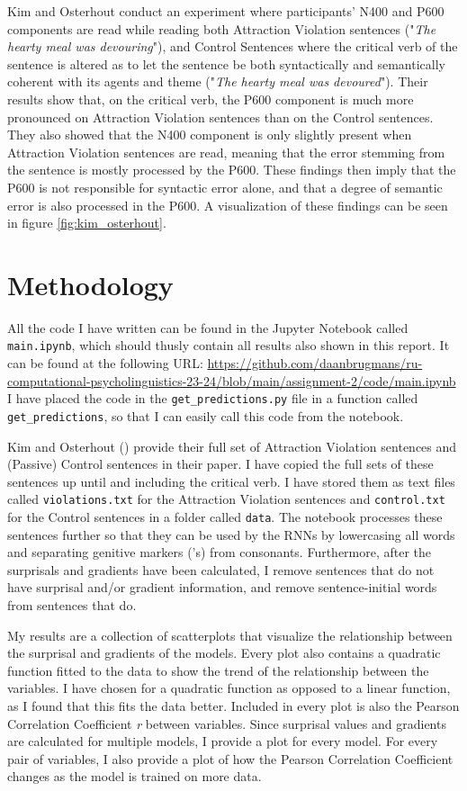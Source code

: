 \documentclass{IEEEtran}
\begin{document}
Kim and Osterhout conduct an experiment where participants' N400 and P600 components are read while reading both Attraction Violation sentences ("\textit{The hearty meal was devouring}"), and Control Sentences where the critical verb of the sentence is altered as to let the sentence be both syntactically and semantically coherent with its agents and theme ("\textit{The hearty meal was devoured}").
Their results show that, on the critical verb, the P600 component is much more pronounced on Attraction Violation sentences than on the Control sentences.
They also showed that the N400 component is only slightly present when Attraction Violation sentences are read, meaning that the error stemming from the sentence is mostly processed by the P600.
These findings then imply that the P600 is not responsible for syntactic error alone, and that a degree of semantic error is also processed in the P600.
A visualization of these findings can be seen in figure \ref{fig:kim_osterhout}.

\section{Methodology}
All the code I have written can be found in the Jupyter Notebook called \texttt{main.ipynb}, which should thusly contain all results also shown in this report.
It can be found at the following URL: \url{https://github.com/daanbrugmans/ru-computational-psycholinguistics-23-24/blob/main/assignment-2/code/main.ipynb}
I have placed the code in the \texttt{get\_predictions.py} file in a function called \texttt{get\_predictions}, so that I can easily call this code from the notebook.

Kim and Osterhout (\cite{kim2005combinatory}) provide their full set of Attraction Violation sentences and (Passive) Control sentences in their paper.
I have copied the full sets of these sentences up until and including the critical verb.
I have stored them as text files called \texttt{violations.txt} for the Attraction Violation sentences and \texttt{control.txt} for the Control sentences in a folder called \texttt{data}.
The notebook processes these sentences further so that they can be used by the RNNs by lowercasing all words and separating genitive markers ('s) from consonants.
Furthermore, after the surprisals and gradients have been calculated, I remove sentences that do not have surprisal and/or gradient information, and remove sentence-initial words from sentences that do.

My results are a collection of scatterplots that visualize the relationship between the surprisal and gradients of the models.
Every plot also contains a quadratic function fitted to the data to show the trend of the relationship between the variables.
I have chosen for a quadratic function as opposed to a linear function, as I found that this fits the data better.
Included in every plot is also the Pearson Correlation Coefficient \textit{r} between variables.
Since surprisal values and gradients are calculated for multiple models, I provide a plot for every model.
For every pair of variables, I also provide a plot of how the Pearson Correlation Coefficient changes as the model is trained on more data.
\end{document}
